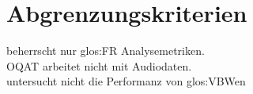 \section{Abgrenzungskriterien}
\setcounter{counterKriterien}{0}
 \projektTitel beherrscht nur \gls{glos:FR} Analysemetriken.\\
 \gls{OQAT} arbeitet nicht mit Audiodaten.\\
 \projektTitel untersucht nicht die Performanz von \gls{glos:VBW}en\\
